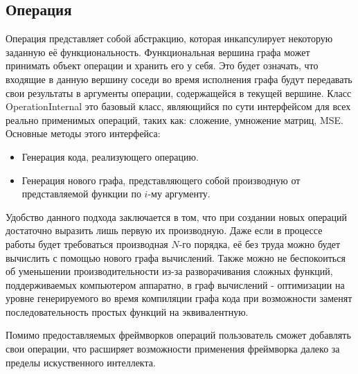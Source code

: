 \subsection{Операция}
Операция представляет собой абстракцию, которая инкапсулирует некоторую заданную её функциональность. Функциональная вершина графа может принимать объект операции и хранить его у себя. Это будет означать, что входящие в данную вершину соседи во время исполнения графа будут передавать свои результаты в аргументы операции, содержащейся в текущей вершине. Класс OperationInternal это базовый класс, являющийся по сути интерфейсом для всех реально применимых операций, таких как: сложение, умножение матриц, MSE. Основные методы этого интерфейса:
\begin{itemize} 
    \item Генерация кода, реализующего операцию.
    \item Генерация нового графа, представляющего собой производную от представляемой функции по $i$-му аргументу.
\end{itemize}
Удобство данного подхода заключается в том, что при создании новых операций достаточно выразить лишь первую их производную. Даже если в процессе работы будет требоваться производная $N$-го порядка, её без труда можно будет вычислить с помощью нового графа вычислений. Также можно не беспокоиться об уменьшении производительности из-за разворачивания сложных функций, поддерживаемых компьютером аппаратно, в граф вычислений - оптимизации на уровне генерируемого во время компиляции графа кода при возможности заменят последовательность простых функций на эквивалентную.
\par 
Помимо предоставляемых фреймворков операций пользователь сможет добавлять свои операции, что расширяет возможности применения фреймворка далеко за пределы искуственного интеллекта.

